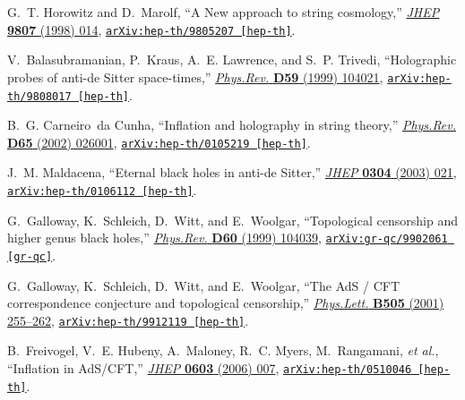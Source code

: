\documentclass[12pt]{article}
\begin{document}
\begin{thebibliography}{10}
G.~T. Horowitz and D.~Marolf, ``{A New approach to string cosmology},''
  \href{http://dx.doi.org/10.1088/1126-6708/1998/07/014}{{\em JHEP} {\bf 9807}
  (1998)  014},
\href{http://arxiv.org/abs/hep-th/9805207}{{\tt arXiv:hep-th/9805207
  [hep-th]}}.

V.~Balasubramanian, P.~Kraus, A.~E. Lawrence, and S.~P. Trivedi, ``{Holographic
  probes of anti-de Sitter space-times},''
  \href{http://dx.doi.org/10.1103/PhysRevD.59.104021}{{\em Phys.Rev.} {\bf D59}
  (1999)  104021},
\href{http://arxiv.org/abs/hep-th/9808017}{{\tt arXiv:hep-th/9808017
  [hep-th]}}.

B.~G. Carneiro~da Cunha, ``{Inflation and holography in string theory},''
  \href{http://dx.doi.org/10.1103/PhysRevD.65.026001}{{\em Phys.Rev.} {\bf D65}
  (2002)  026001},
\href{http://arxiv.org/abs/hep-th/0105219}{{\tt arXiv:hep-th/0105219
  [hep-th]}}.

J.~M. Maldacena, ``{Eternal black holes in anti-de Sitter},''
  \href{http://dx.doi.org/10.1088/1126-6708/2003/04/021}{{\em JHEP} {\bf 0304}
  (2003)  021},
\href{http://arxiv.org/abs/hep-th/0106112}{{\tt arXiv:hep-th/0106112
  [hep-th]}}.

G.~Galloway, K.~Schleich, D.~Witt, and E.~Woolgar, ``{Topological censorship
  and higher genus black holes},''
  \href{http://dx.doi.org/10.1103/PhysRevD.60.104039}{{\em Phys.Rev.} {\bf D60}
  (1999)  104039},
\href{http://arxiv.org/abs/gr-qc/9902061}{{\tt arXiv:gr-qc/9902061 [gr-qc]}}.

G.~Galloway, K.~Schleich, D.~Witt, and E.~Woolgar, ``{The AdS / CFT
  correspondence conjecture and topological censorship},''
  \href{http://dx.doi.org/10.1016/S0370-2693(01)00335-5}{{\em Phys.Lett.} {\bf
  B505} (2001)  255--262},
\href{http://arxiv.org/abs/hep-th/9912119}{{\tt arXiv:hep-th/9912119
  [hep-th]}}.

B.~Freivogel, V.~E. Hubeny, A.~Maloney, R.~C. Myers, M.~Rangamani, {\em et
  al.}, ``{Inflation in AdS/CFT},''
  \href{http://dx.doi.org/10.1088/1126-6708/2006/03/007}{{\em JHEP} {\bf 0603}
  (2006)  007},
\href{http://arxiv.org/abs/hep-th/0510046}{{\tt arXiv:hep-th/0510046
  [hep-th]}}.


\end{thebibliography}
\end{document}
